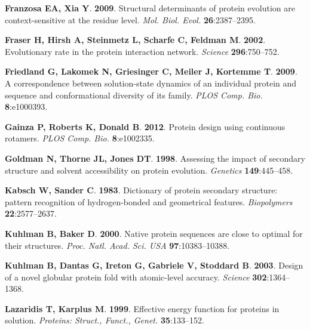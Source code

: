 \documentclass[12pt]{article}
\begin{document}
\begin{thebibliography}{36}
\textbf{Franzosa EA, Xia Y}. \textbf{2009}.
\newblock Structural determinants of protein evolution are context-sensitive at
  the residue level.
\newblock \emph{Mol. Biol. Evol.} \textbf{26}:2387--2395.

\textbf{Fraser H, Hirsh A, Steinmetz L, Scharfe C, Feldman M}. \textbf{2002}.
\newblock Evolutionary rate in the protein interaction network.
\newblock \emph{Science} \textbf{296}:750--752.

\textbf{Friedland G, Lakomek N, Griesinger C, Meiler J, Kortemme T}.
  \textbf{2009}.
\newblock A correspondence between solution-state dynamics of an individual
  protein and sequence and conformational diversity of its family.
\newblock \emph{PLOS Comp. Bio.} \textbf{8}:e1000393.

\textbf{Gainza P, Roberts K, Donald B}. \textbf{2012}.
\newblock Protein design using continuous rotamers.
\newblock \emph{PLOS Comp. Bio.} \textbf{8}:e1002335.

\textbf{Goldman N, Thorne JL, Jones DT}. \textbf{1998}.
\newblock Assessing the impact of secondary structure and solvent accessibility
  on protein evolution.
\newblock \emph{Genetics} \textbf{149}:445--458.

\textbf{Kabsch W, Sander C}. \textbf{1983}.
\newblock Dictionary of protein secondary structure: pattern recognition of
  hydrogen-bonded and geometrical features.
\newblock \emph{Biopolymers} \textbf{22}:2577--2637.

\textbf{Kuhlman B, Baker D}. \textbf{2000}.
\newblock Native protein sequences are close to optimal for their structures.
\newblock \emph{Proc. Natl. Acad. Sci. USA} \textbf{97}:10383--10388.

\textbf{Kuhlman B, Dantas G, Ireton G, Gabriele V, Stoddard B}. \textbf{2003}.
\newblock Design of a novel globular protein fold with atomic-level accuracy.
\newblock \emph{Science} \textbf{302}:1364--1368.

\textbf{Lazaridis T, Karplus M}. \textbf{1999}.
\newblock Effective energy function for proteins in solution.
\newblock \emph{Proteins: Struct., Funct., Genet.} \textbf{35}:133--152.


\end{thebibliography}
\end{document}
